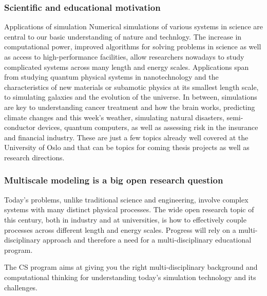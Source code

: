 \documentclass{beamer}
\begin{document}
\begin{frame}
\frametitle{Scientific and educational motivation}

\begin{block}{Applications of simulation }
Numerical simulations of various systems in science are central to our
basic understanding of nature and technlogy.
The increase in computational power,
improved algorithms for solving problems in science as well as access
to high-performance facilities, allow researchers nowadays to study
complicated systems across many length and energy scales. Applications
span from studying quantum physical systems in nanotechnology and the
characteristics of new materials or subamotic physics at its smallest
length scale, to simulating galaxies and the evolution of the universe.
In between, simulations are key to understanding
cancer treatment and how the brain works,
predicting climate changes and this week's weather,
simulating natural disasters, semi-conductor devices,
quantum computers, as well as assessing risk in the insurance and
financial industry. These are just a few topics
already well covered at the University of Oslo and that can be
topics for coming thesis projects as well as research directions.
\end{block}
\end{frame}

\begin{frame}
\frametitle{Multiscale modeling is a big open research question}

\begin{block}{}
Today's problems, unlike traditional
science and engineering, involve complex systems with many distinct
physical processes. The wide open research topic of this century, both
in industry and at universities, is how to effectively couple
processes across different length and energy scales. Progress will
rely on a multi-disciplinary approach and therefore a need for
a multi-disciplinary educational program.
\end{block}

\begin{block}{}
The CS program aims at giving you  the right
multi-disciplinary background and computational thinking for
understanding today's simulation technology and its challenges.
\end{block}
\end{frame}
\end{document}
